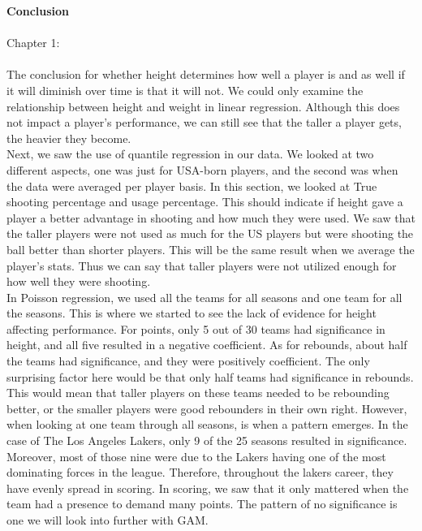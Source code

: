\documentclass[11pt,letterpaper]{amsart}
\begin{document}
\newpage \noindent \textbf{Conclusion}\\\\


Chapter 1:\\\\
\indent The conclusion for whether height determines how well a player is and as well if it will diminish over time is that it will not. We could only examine the relationship between height and weight in linear regression. Although this does not impact a player's performance, we can still see that the taller a player gets, the heavier they become.\\
\indent Next, we saw the use of quantile regression in our data. We looked at two different aspects, one was just for USA-born players, and the second was when the data were averaged per player basis. In this section, we looked at True shooting percentage and usage percentage. This should indicate if height gave a player a better advantage in shooting and how much they were used. We saw that the taller players were not used as much for the US players but were shooting the ball better than shorter players. This will be the same result when we average the player's stats. Thus we can say that taller players were not utilized enough for how well they were shooting.\\
\indent In Poisson regression, we used all the teams for all seasons and one team for all the seasons. This is where we started to see the lack of evidence for height affecting performance. For points, only 5 out of 30 teams had significance in height, and all five resulted in a negative coefficient. As for rebounds, about half the teams had significance, and they were positively coefficient. The only surprising factor here would be that only half teams had significance in rebounds. This would mean that taller players on these teams needed to be rebounding better, or the smaller players were good rebounders in their own right. However, when looking at one team through all seasons, is when a pattern emerges. In the case of The Los Angeles Lakers, only 9 of the 25 seasons resulted in significance. Moreover, most of those nine were due to the Lakers having one of the most dominating forces in the league. Therefore, throughout the lakers career, they have evenly spread in scoring. In scoring, we saw that it only mattered when the team had a presence to demand many points. The pattern of no significance is one we will look into further with GAM.\\
\end{document}
